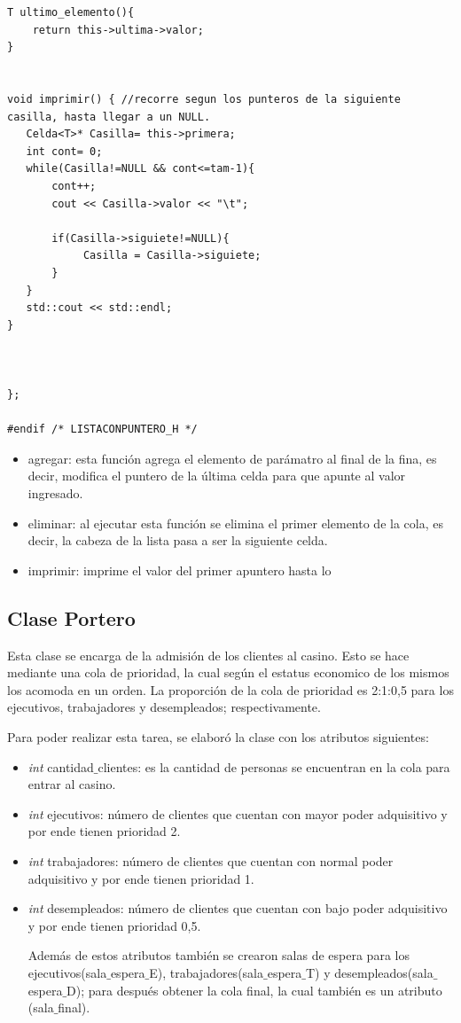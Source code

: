 \documentclass[11pt]{article}
\begin{document}
\begin{lstlisting}
T ultimo_elemento(){
    return this->ultima->valor;
}


void imprimir() { //recorre segun los punteros de la siguiente casilla, hasta llegar a un NULL.
   Celda<T>* Casilla= this->primera;
   int cont= 0;
   while(Casilla!=NULL && cont<=tam-1){
       cont++;
       cout << Casilla->valor << "\t";
       
       if(Casilla->siguiete!=NULL){
            Casilla = Casilla->siguiete;
       }
   }
   std::cout << std::endl;
}
    
   

};

#endif /* LISTACONPUNTERO_H */

\end{lstlisting}


\begin{itemize}
\item agregar: esta función agrega el elemento de parámatro al final de la fina, es decir, modifica el puntero de la última celda para que apunte al valor ingresado.
\item eliminar: al ejecutar esta función se elimina el primer elemento de la cola, es decir, la cabeza de la lista pasa a ser la siguiente celda.
\item imprimir: imprime el valor del primer apuntero hasta lo
\end{itemize}



\newpage 
\subsection{Clase Portero}
Esta clase se encarga de la admisión de los clientes al casino. Esto se hace mediante una cola de prioridad, la cual según el estatus economico de los mismos los acomoda en un orden. La proporción de la cola de prioridad es 2:1:0,5 para los ejecutivos, trabajadores y desempleados; respectivamente. 

Para poder realizar esta tarea, se elaboró la clase con los atributos siguientes:
\begin{itemize}
\item \textit{int} cantidad$\_$clientes: es la cantidad de personas se encuentran en la cola para entrar al casino.
\item \textit{int} ejecutivos: número de clientes que cuentan con mayor poder adquisitivo y por ende tienen prioridad 2.
\item \textit{int} trabajadores: número de clientes que cuentan con normal poder adquisitivo y por ende tienen prioridad 1.
\item \textit{int} desempleados: número de clientes que cuentan con bajo poder adquisitivo y por ende tienen prioridad 0,5.

Además de estos atributos también se crearon salas de espera para los ejecutivos(sala$\_$espera$\_$E), trabajadores(sala$\_$espera$\_$T) y desempleados(sala$\_$espera$\_$D); para después obtener la cola final, la cual también es un atributo (sala$\_$final).
\end{itemize}
\end{document}
